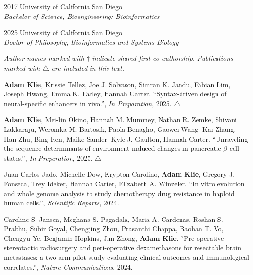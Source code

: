 \documentclass[11pt]{formatting-template}
\begin{document}
\begin{vita}
\noindent
\begin{cv}{}
\begin{cvlist}{}
	\item[2017] University of California San Diego\\
		\textit{Bachelor of Science, Bioengineering: Bioinformatics}
	\item[2025] University of California San Diego\\
		\textit{Doctor of Philosophy, Bioinformatics and Systems Biology}
\end{cvlist}
\end{cv}

\noindent \textit{Author names marked with $\dagger$ indicate shared first co-authorship.} \newline
\noindent \textit{Publications marked with $\triangle$ are included in this text.} \newline

\noindent \textbf{Adam Klie}, Krissie Tellez, Joe J. Solvason, Simran K. Jandu, Fabian Lim, Joseph Hwang, Emma K. Farley, Hannah Carter. ``Syntax-driven design of neural-specific enhancers in vivo.'', \textit{In Preparation}, 2025. $\triangle$ \newline

\noindent \textbf{Adam Klie}, Mei-lin Okino, Hannah M. Mummey, Nathan R. Zemke, Shivani Lakkaraju, Weronika M. Bartosik, Paola Benaglio, Gaowei Wang, Kai Zhang, Han Zhu, Bing Ren, Maike Sander, Kyle J. Gaulton, Hannah Carter. ``Unraveling the sequence determinants of environment-induced changes in pancreatic $\beta$-cell states.'', \textit{In Preparation}, 2025. $\triangle$ \newline

\noindent Juan Carlos Jado, Michelle Dow, Krypton Carolino, \textbf{Adam Klie}, Gregory J. Fonseca, Trey Ideker, Hannah Carter, Elizabeth A. Winzeler. ``In vitro evolution and whole genome analysis to study chemotherapy drug resistance in haploid human cells.'', \textit{Scientific Reports}, 2024. \newline

\noindent Caroline S. Jansen, Meghana S. Pagadala, Maria A. Cardenas, Roshan S. Prabhu, Subir Goyal, Chengjing Zhou, Prasanthi Chappa, Baohan T. Vo, Chengyu Ye, Benjamin Hopkins, Jim Zhong, \textbf{Adam Klie}. ``Pre-operative stereotactic radiosurgery and peri-operative dexamethasone for resectable brain metastases: a two-arm pilot study evaluating clinical outcomes and immunological correlates.'', \textit{Nature Communications}, 2024. \newline


\end{vita}
\end{document}
